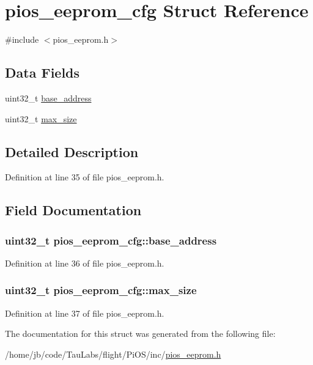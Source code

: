 \hypertarget{structpios__eeprom__cfg}{\section{pios\-\_\-eeprom\-\_\-cfg \-Struct \-Reference}
\label{structpios__eeprom__cfg}
}


{\ttfamily \#include $<$pios\-\_\-eeprom.\-h$>$}

\subsection*{\-Data \-Fields}
\begin{DoxyCompactItemize}
\item 
uint32\-\_\-t \hyperlink{structpios__eeprom__cfg_a18fb5ba0b30fbb8656ce2198aae2bdfa}{base\-\_\-address}
\item 
uint32\-\_\-t \hyperlink{structpios__eeprom__cfg_a86c7bcba53acd76ef56bac1dd0e2fe95}{max\-\_\-size}
\end{DoxyCompactItemize}


\subsection{\-Detailed \-Description}


\-Definition at line 35 of file pios\-\_\-eeprom.\-h.



\subsection{\-Field \-Documentation}
\hypertarget{structpios__eeprom__cfg_a18fb5ba0b30fbb8656ce2198aae2bdfa}{
\subsubsection[{base\-\_\-address}]{\setlength{\rightskip}{0pt plus 5cm}uint32\-\_\-t {\bf pios\-\_\-eeprom\-\_\-cfg\-::base\-\_\-address}}}\label{structpios__eeprom__cfg_a18fb5ba0b30fbb8656ce2198aae2bdfa}


\-Definition at line 36 of file pios\-\_\-eeprom.\-h.

\hypertarget{structpios__eeprom__cfg_a86c7bcba53acd76ef56bac1dd0e2fe95}{
\subsubsection[{max\-\_\-size}]{\setlength{\rightskip}{0pt plus 5cm}uint32\-\_\-t {\bf pios\-\_\-eeprom\-\_\-cfg\-::max\-\_\-size}}}\label{structpios__eeprom__cfg_a86c7bcba53acd76ef56bac1dd0e2fe95}


\-Definition at line 37 of file pios\-\_\-eeprom.\-h.



\-The documentation for this struct was generated from the following file\-:\begin{DoxyCompactItemize}
\item 
/home/jb/code/\-Tau\-Labs/flight/\-Pi\-O\-S/inc/\hyperlink{pios__eeprom_8h}{pios\-\_\-eeprom.\-h}\end{DoxyCompactItemize}
